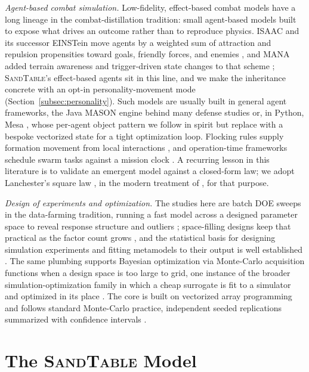 \documentclass[11pt]{article}
\newcommand{\sandtable}{\textsc{SandTable}}
\begin{document}
\emph{Agent-based combat simulation.} Low-fidelity, effect-based combat models have a long lineage in the combat-distillation tradition: small agent-based models built to expose what drives an outcome rather than to reproduce physics. ISAAC and its successor EINSTein move agents by a weighted sum of attraction and repulsion propensities toward goals, friendly forces, and enemies \citep{ilachinski2000isaac,ilachinski2004artificial}, and MANA added terrain awareness and trigger-driven state changes to that scheme \citep{lauren2002mana}; \sandtable{}'s effect-based agents sit in this line, and we make the inheritance concrete with an opt-in personality-movement mode (Section~\ref{subsec:personality}). Such models are usually built in general agent frameworks, the Java MASON engine behind many defense studies \citep{luke2005mason} or, in Python, Mesa \citep{masad2015mesa}, whose per-agent object pattern we follow in spirit but replace with a bespoke vectorized state for a tight optimization loop. Flocking rules supply formation movement from local interactions \citep{reynolds1987flocks}, and operation-time frameworks schedule swarm tasks against a mission clock \citep{wei2013operation}. A recurring lesson in this literature is to validate an emergent model against a closed-form law; we adopt Lanchester's square law \citep{lanchester1916aircraft}, in the modern treatment of \citet{kress2020lanchester}, for that purpose.

\emph{Design of experiments and optimization.} The studies here are batch DOE sweeps in the data-farming tradition, running a fast model across a designed parameter space to reveal response structure and outliers \citep{horne2004datafarming}; space-filling designs keep that practical as the factor count grows \citep{cioppa2007nolh}, and the statistical basis for designing simulation experiments and fitting metamodels to their output is well established \citep{kleijnen2015doe}. The same plumbing supports Bayesian optimization via Monte-Carlo acquisition functions \citep{balandat2020botorch} when a design space is too large to grid, one instance of the broader simulation-optimization family \citep{amaran2016simulation} in which a cheap surrogate is fit to a simulator and optimized in its place \citep{barton2006metamodel}. The core is built on vectorized array programming \citep{harris2020numpy} and follows standard Monte-Carlo practice, independent seeded replications summarized with confidence intervals \citep{law2015simulation}.

\section{The \sandtable{} Model}
\label{sec:model}
\end{document}
